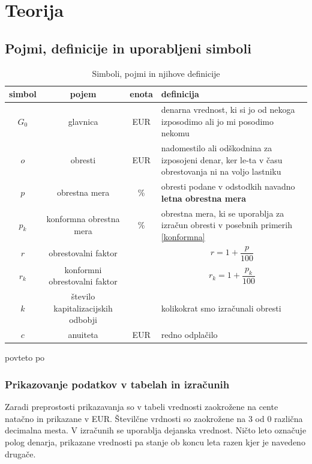 \documentclass[12pt]{article}
\begin{document}
\section{Teorija}
    \subsection{Pojmi, definicije in uporabljeni simboli}
        \begin{table}[h!]
            \centering
            \begin{tabular}{|c|c|c|p{7cm}|}
                \hline
                \textbf{simbol} & \textbf{pojem} & \textbf{enota} & \textbf{definicija} \\ \hline
                $G_0$ & glavnica                & EUR    & denarna vrednost, ki si jo od nekoga izposodimo ali jo mi posodimo nekomu \\ \hline 
                $o$   & obresti                 & EUR    & nadomestilo ali odškodnina za izposojeni denar, ker le-ta v času obrestovanja ni na voljo lastniku \\ \hline
                $p$   & obrestna mera           & \%     & obresti podane v odstodkih navadno \textbf{letna obrestna mera} \\ \hline
                $p_k$ & konformna obrestna mera & \%     & obrestna mera, ki se uporablja za izračun obresti v posebnih primerih \ref{konformna} \\ \hline
                $r$   & obrestovalni faktor     &        & $$r = 1 + \frac{p}{100}$$ \\ \hline
                $r_k$ & konformni obrestovalni faktor &  & $$r_k = 1 + \frac{p_k}{100}$$ \\ \hline
                $k$   & število kapitalizacijskih odbobji &  & kolikokrat smo izračunali obresti \\ \hline
                $c$   & anuiteta                & EUR    & redno odplačilo \\ \hline
            \end{tabular}

            \medskip
            \centering povteto po \cite{vega4}
            \caption{Simboli, pojmi in njihove definicije}
            \label{tab:simboli}
        \end{table}

        \subsubsection{Prikazovanje podatkov v tabelah in izračunih}
        Zaradi preprostosti prikazavanja so v tabeli vrednosti zaokrožene na cente natačno
        in prikazane v EUR. Številčne vrdnosti so zaokrožene na 3 od 0 različna decimalna 
        mesta. V izračunih se uporablja dejanska vrednost. Ničto leto označuje polog denarja,
        prikazane vrednosti pa stanje ob koncu leta razen kjer je navedeno drugače. 
\end{document}
